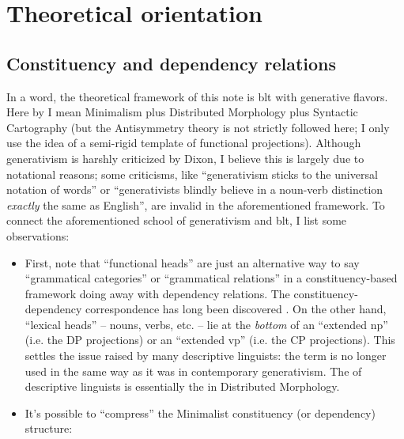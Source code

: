  
\section{Theoretical orientation}\label{sec:theoretical-orientation}

{\small

\subsection{Constituency and dependency relations}

In a word, the theoretical framework of this note 
is \ac{blt}\citep{dixon2009basic1,dixon2010basic2,dixon2012basic3}
with generative flavors.
Here by  I mean 
Minimalism plus Distributed Morphology plus Syntactic Cartography 
(but the Antisymmetry theory is not strictly followed here; 
I only use the idea of a semi-rigid template of functional projections).
Although generativism is harshly criticized by Dixon, 
I believe this is largely due to notational reasons;
some criticisms, like ``generativism sticks to the universal notation of words''
or ``generativists blindly believe in a 
noun-verb distinction \emph{exactly} the same as English'',
are invalid in the aforementioned framework. 
To connect the aforementioned school of generativism and \ac{blt}, 
I list some observations:
\begin{itemize}
    \item First, note that ``functional heads'' are just 
        an alternative way to say ``grammatical categories'' or ``grammatical relations''
        in a constituency-based framework doing away with dependency relations.
        The constituency-dependency correspondence 
        has long been discovered 
        \citep{schneider1998linguistic,osborne2011bare,kahane2015syntactic,nefdt2023notational}. 
        On the other hand, 
        ``lexical heads'' -- nouns, verbs, etc. -- 
        lie at the \emph{bottom} of an ``extended \ac{np}'' (i.e. the DP projections) 
        or an ``extended \ac{vp}'' (i.e. the CP projections).
        This settles the issue raised by many descriptive linguists: 
        the term  is no longer used in the same way 
        as it was in contemporary generativism.
        The  of descriptive linguists is essentially the  in Distributed Morphology.
    \item It's possible to ``compress'' the Minimalist constituency (or dependency) structure: 

\end{itemize}}
